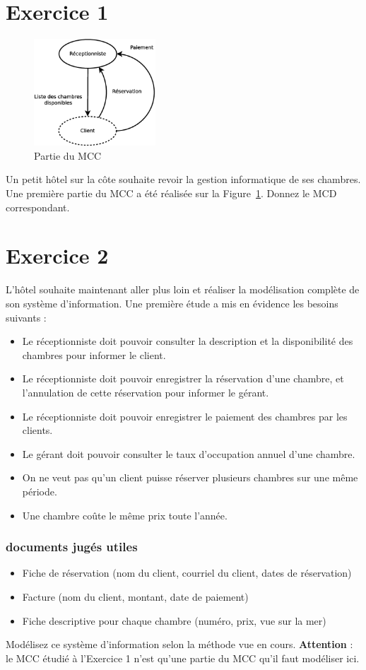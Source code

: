 \section*{Exercice 1}
\begin{figure}
    \vspace{-1.5cm}
    \includegraphics[height=4cm]{mcc.eps} 
    \caption{\label{mcc} Partie du MCC}
\end{figure}

Un petit hôtel sur la côte souhaite revoir la gestion informatique de ses chambres. Une première partie du MCC a été réalisée sur la Figure~\ref{mcc}. Donnez le MCD correspondant.

\section*{Exercice 2}

L'hôtel souhaite maintenant aller plus loin et réaliser la modélisation complète de son système d'information. Une première étude a mis en évidence les besoins suivants : \\
\begin{itemize}
    \item Le réceptionniste doit pouvoir consulter la description et la disponibilité des chambres pour informer le client.
    \item Le réceptionniste doit pouvoir enregistrer la réservation d'une chambre, et l'annulation de cette réservation pour informer le gérant.
    \item Le réceptionniste doit pouvoir enregistrer le paiement des chambres par les clients.
    \item Le gérant doit pouvoir consulter le taux d'occupation annuel d'une chambre.
    \item On ne veut pas qu'un client puisse réserver plusieurs chambres sur une même période.
    \item Une chambre coûte le même prix toute l'année.
\end{itemize}

\subsubsection*{documents jugés utiles}
\begin{itemize}
    \item Fiche de réservation (nom du client, courriel du client, dates de réservation)
    \item Facture (nom du client, montant, date de paiement)
    \item Fiche descriptive pour chaque chambre (numéro, prix, vue sur la mer)\\
\end{itemize}

Modélisez ce système d'information selon la méthode vue en cours. \textbf{Attention} : le MCC étudié à l'Exercice 1 n'est qu'une partie du MCC qu'il faut modéliser ici.
